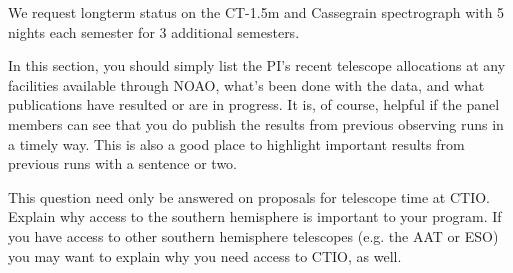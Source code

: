 %
%
%
%
%
%
\longtermdetails
We request longterm status on the CT-1.5m and Cassegrain spectrograph
with 5 nights each semester for 3 additional semesters.

%

\thepast
In this section, you should simply list the PI's recent telescope allocations
at any facilities available through NOAO, what's been done with the data, 
and what publications have resulted or are in progress.  It is, of course, 
helpful if the panel members can see that you do publish the results from 
previous observing runs in a timely way.
This is also a good place to highlight important results from previous 
runs with a sentence or two.

%

\whyctio
This question need only be answered on proposals for telescope time at CTIO.
Explain why access to the southern hemisphere is
important to your program.  If you have access to other southern hemisphere
telescopes (e.g. the AAT or ESO) you may want to explain why you need access
to CTIO, as well.


